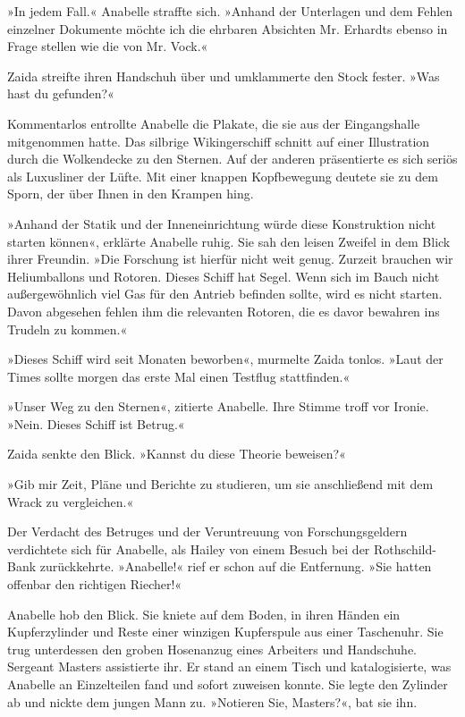 »In jedem Fall.« Anabelle straffte sich. »Anhand der Unterlagen und
dem Fehlen einzelner Dokumente möchte ich die ehrbaren Absichten
Mr. Erhardts ebenso in Frage stellen wie die von Mr. Vock.«

Zaida streifte ihren Handschuh über und umklammerte den Stock
fester. »Was hast du gefunden?«

Kommentarlos entrollte Anabelle die Plakate, die sie aus der
Eingangshalle mitgenommen hatte. Das silbrige Wikingerschiff
schnitt auf einer Illustration durch die Wolkendecke zu den
Sternen. Auf der anderen präsentierte es sich seriös als Luxusliner
der Lüfte. Mit einer knappen Kopfbewegung deutete sie zu dem Sporn,
der über Ihnen in den Krampen hing.

»Anhand der Statik und der Inneneinrichtung würde diese
Konstruktion nicht starten können«, erklärte Anabelle ruhig. Sie
sah den leisen Zweifel in dem Blick ihrer Freundin. »Die Forschung
ist hierfür nicht weit genug. Zurzeit brauchen wir Heliumballons
und Rotoren. Dieses Schiff hat Segel. Wenn sich im Bauch nicht
außergewöhnlich viel Gas für den Antrieb befinden sollte, wird es
nicht starten. Davon abgesehen fehlen ihm die relevanten Rotoren,
die es davor bewahren ins Trudeln zu kommen.«

»Dieses Schiff wird seit Monaten beworben«, murmelte Zaida tonlos.
»Laut der Times sollte morgen das erste Mal einen Testflug
stattfinden.«

»Unser Weg zu den Sternen«, zitierte Anabelle. Ihre Stimme troff
vor Ironie. »Nein. Dieses Schiff ist Betrug.«

Zaida senkte den Blick. »Kannst du diese Theorie beweisen?«

»Gib mir Zeit, Pläne und Berichte zu studieren, um sie anschließend
mit dem Wrack zu vergleichen.«

\tb

Der Verdacht des Betruges und der Veruntreuung von
Forschungsgeldern verdichtete sich für Anabelle, als Hailey von
einem Besuch bei der Rothschild-Bank zurückkehrte. »Anabelle!« rief
er schon auf die Entfernung. »Sie hatten offenbar den richtigen
Riecher!«

\bigpar

Anabelle hob den Blick. Sie kniete auf dem Boden, in ihren Händen
ein Kupferzylinder und Reste einer winzigen Kupferspule aus einer
Taschenuhr. Sie trug unterdessen den groben Hosenanzug eines
Arbeiters und Handschuhe. Sergeant Masters assistierte ihr. Er
stand an einem Tisch und katalogisierte, was Anabelle an
Einzelteilen fand und sofort zuweisen konnte. Sie legte den
Zylinder ab und nickte dem jungen Mann zu. »Notieren Sie,
Masters?«, bat sie ihn.

